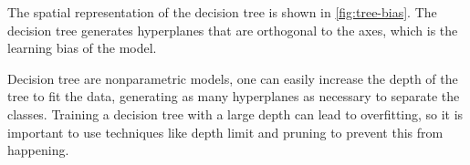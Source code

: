 The spatial representation of the decision tree is shown in \cref{fig:tree-bias}.  The
decision tree generates hyperplanes that are orthogonal to the axes, which is the learning
bias of the model.

Decision tree are nonparametric models, one can easily increase the depth of the tree to
fit the data, generating as many hyperplanes as necessary to separate the classes.
Training a decision tree with a large depth can lead to overfitting, so it is important to
use techniques like depth limit and pruning to prevent this from happening.

%
%
%
%


